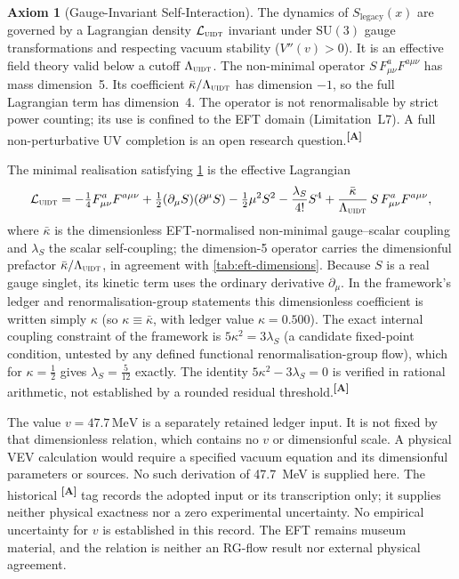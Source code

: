 \documentclass[12pt,a4paper,twoside]{article}
\theoremstyle{plain}
\theoremstyle{definition}
\newtheorem{axiom}{Axiom}
\theoremstyle{remark}
\newcommand{\UIDT}{\textsc{uidt}} %
\newcommand{\MeV}{\,\mathrm{MeV}}
\newcommand{\catmark}[1]{\textsuperscript{\textsf{\textbf{[#1]}}}}
\newcommand{\LegacySx}{S_{\mathrm{legacy}}(x)} %
\newcommand{\kappaVal}{0.500} %
\newcommand{\vVEV}{47.7\MeV} %
\begin{document}
\begin{axiom}[Gauge-Invariant Self-Interaction]
\label{ax:gauge}
The dynamics of $\LegacySx$ are governed by a Lagrangian density
$\mathcal{L}_{\UIDT}$ invariant under $\mathrm{SU}(3)$ gauge
transformations and respecting vacuum stability ($V''(v)>0$). It is an
effective field theory valid below a cutoff $\Lambda_{\UIDT}$. The non-minimal operator $S\,F_{\mu\nu}^aF^{a\mu\nu}$ has mass dimension~5.
Its coefficient $\bar\kappa/\Lambda_{\UIDT}$ has dimension $-1$, so the full
Lagrangian term has dimension~4. The operator is not renormalisable by strict
power counting; its use is confined to the EFT domain (Limitation~L7). A
full non-perturbative UV completion is an open research
question.\catmark{A}
\end{axiom}

\noindent The minimal realisation satisfying \cref{ax:gauge} is the
effective Lagrangian
\begin{equation}
 \mathcal{L}_{\UIDT}
 = -\tfrac{1}{4}F_{\mu\nu}^a F^{a\mu\nu}
 + \tfrac{1}{2}(\partial_\mu S)(\partial^\mu S)
 - \tfrac{1}{2}\mu^2 S^2
 - \frac{\lambda_S}{4!}S^4
 + \frac{\bar\kappa}{\Lambda_{\UIDT}}\,S\,F_{\mu\nu}^a F^{a\mu\nu},
 \label{eq:lagrangian}
\end{equation}
where $\bar\kappa$ is the dimensionless EFT-normalised non-minimal
gauge--scalar coupling and $\lambda_S$ the scalar self-coupling; the
dimension-5 operator carries the dimensionful prefactor
$\bar\kappa/\Lambda_{\UIDT}$, in agreement with
\cref{tab:eft-dimensions}. Because $S$ is a real gauge singlet, its
kinetic term uses the ordinary derivative $\partial_\mu$. In the
framework's ledger and renormalisation-group statements this
dimensionless coefficient is written simply $\kappa$ (so
$\kappa\equiv\bar\kappa$, with ledger value $\kappa=\kappaVal$). The
exact internal coupling constraint of the framework is
$5\kappa^2 = 3\lambda_S$ (a candidate fixed-point condition, untested by
any defined functional renormalisation-group flow), which for
$\kappa=\tfrac12$ gives $\lambda_S=\tfrac5{12}$ exactly. The identity
$5\kappa^2-3\lambda_S=0$ is verified in rational arithmetic, not established
by a rounded residual threshold.\catmark{A}

The value $v=\vVEV$ is a separately retained ledger input. It is not fixed
by that dimensionless relation, which contains no $v$ or dimensionful scale.
A physical VEV calculation would require a specified vacuum equation and its
dimensionful parameters or sources. No such derivation of 47.7~MeV is supplied
here. The historical \catmark{A} tag records the adopted input or its
transcription only; it supplies neither physical exactness nor a zero
experimental uncertainty. No empirical uncertainty for $v$ is established in
this record. The EFT remains museum material, and the relation is neither an
RG-flow result nor external physical agreement.
\end{document}
